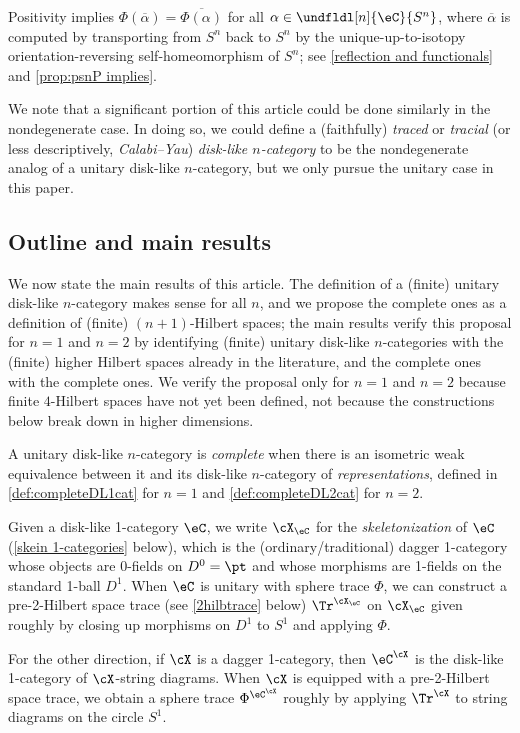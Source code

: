 \documentclass[12pt,reqno]{amsart}
\newcounter{alpha}\renewcommand\thealpha{\upshape\Alph{alpha}}
\newcommand{\psn}{\Phi}
\newcommand{\C}{\eC}
\newcommand{\fcj}[1]{\overline{#1}}
\newcommand{\defn}[1]{\emph{#1}}
\begin{document}
Positivity implies $\psn(\fcj\alpha)=\overline{\psn(\alpha)}$ for all $\alpha\in\undfldl[n]{\C}{S^n}$, where $\fcj\alpha$ is computed by transporting from $S^n$ back to $S^n$ by the unique-up-to-isotopy orientation-reversing self-homeomorphism of $S^n$; see \cref{reflection and functionals} and \cref{prop:psnP implies}.

We note that a significant portion of this article could be done similarly in the nondegenerate case. In doing so, we could define a (faithfully) \defn{traced} or \defn{tracial} (or less descriptively, \defn{Calabi--Yau}) \defn{disk-like $n$-category} to be the nondegenerate analog of a unitary disk-like $n$-category, but we only pursue the unitary case in this paper.



\subsection{Outline and main results}

We now state the main results of this article. The definition of a (finite) unitary disk-like $n$-category makes sense for all $n$, and we propose the complete ones as a definition of (finite) $(n+1)$-Hilbert spaces; the main results verify this proposal for $n=1$ and $n=2$ by identifying (finite) unitary disk-like $n$-categories with the (finite) higher Hilbert spaces already in the literature, and the complete ones with the complete ones. We verify the proposal only for $n=1$ and $n=2$ because finite $4$-Hilbert spaces have not yet been defined, not because the constructions below break down in higher dimensions.

A unitary disk-like $n$-category is \defn{complete} when there is an isometric weak equivalence between it and its disk-like $n$-category of \defn{representations}, defined in \cref{def:completeDL1cat} for $n=1$ and \cref{def:completeDL2cat} for $n=2$. 

Given a disk-like 1-category $\C$, we write $\cX_\eC$ for the \defn{skeletonization} of $\C$ (\cref{skein 1-categories} below), which is the (ordinary/traditional) dagger 1-category whose objects are 0-fields on $D^0=\pt$ and whose morphisms are 1-fields on the standard 1-ball $D^1$. When $\C$ is unitary with sphere trace $\psn$, we can construct a pre-2-Hilbert space trace (see \cref{2hilbtrace} below) $\Tr^{\cX_\eC}$ on $\cX_\eC$ given roughly by closing up morphisms on $D^1$ to $S^1$ and applying $\psn$.

For the other direction, if $\cX$ is a dagger 1-category, then $\C^\cX$ is the disk-like 1-category of $\cX$-string diagrams. When $\cX$ is equipped with a pre-2-Hilbert space trace, we obtain a sphere trace $\psn^{\C^\cX}$ roughly by applying $\Tr^\cX$ to string diagrams on the circle $S^1$.
 
\end{document}
